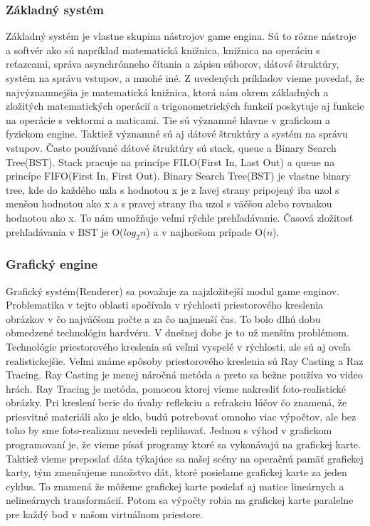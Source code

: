 \documentclass[10pt,oneside,slovak,a4paper,hidelinks]{article}
\begin{document}
		\subsubsection{Základný systém}
			Základný systém je vlastne skupina nástrojov game engina. Sú to rôzne nástroje a softvér ako sú napríklad matematická knižnica, knižnica na operáciu s reťazcami, správa asynchrónneho čítania a zápisu súborov, dátové štruktúry, systém na správu vstupov, a mnohé iné. Z uvedených príkladov vieme povedať, že najvýznamnejšia je matematická knižnica, ktorá nám okrem základných a zložitých matematických operácií a trigonometrických funkcií poskytuje aj funkcie na operácie s vektormi a maticami. Tie sú významné hlavne v grafickom a fyzickom engine. Taktiež významné sú aj dátové štruktúry a systém na správu vstupov. Často používané dátové štruktúry sú stack, queue a Binary Search Tree(BST). Stack pracuje na princípe FILO(First In, Last Out) a queue na princípe FIFO(First In, First Out). Binary Search Tree(BST) je vlastne binary tree, kde do každého uzla s hodnotou x je z ľavej strany pripojený iba uzol s menšou hodnotou ako x a s pravej strany iba uzol s väčšou alebo rovnakou hodnotou ako x. To nám umožňuje veľmi rýchle prehľadávanie. Časová zložitosť prehľadávania v BST je O($log_2n$) a v najhoršom prípade O($n$).
		\subsubsection{Grafický engine}
			Grafický systém(Renderer) sa považuje za najzložitejší modul game enginov. Problematika v tejto oblasti spočívala v rýchlosti priestorového kreslenia obrázkov v čo najväčšom počte a za čo najmenší čas. To bolo dlhú dobu obmedzené technológiu hardvéru. V dnešnej dobe je to už menším problémom. Technológie priestorového kreslenia sú veľmi vyspelé v rýchlosti, ale sú aj oveľa realistickejšie. Veľmi známe spôsoby priestorového kreslenia sú Ray Casting a Raz Tracing. Ray Casting je menej náročná metóda a preto sa bežne používa vo video hrách. Ray Tracing je metóda, pomocou ktorej vieme nakresliť foto-realistické obrázky. Pri kreslení berie do úvahy reflekciu a refrakciu lúčov čo znamená, že priesvitné materiáli ako je sklo, budú potrebovať omnoho viac výpočtov, ale bez toho by sme foto-realizmu nevedeli replikovať. Jednou s výhod v grafickom programovaní je, že vieme písať programy ktoré sa vykonávajú na grafickej karte. Taktiež vieme preposlať dáta týkajúce sa našej scény na operačnú pamäť grafickej karty, tým zmenšujeme množstvo dát, ktoré posielame grafickej karte za jeden cyklus. To znamená že môžeme grafickej karte posielať aj matice lineárnych a nelineárnych transformácií. Potom sa výpočty robia na grafickej karte paralelne pre každý bod v našom virtuálnom priestore.
\end{document}
